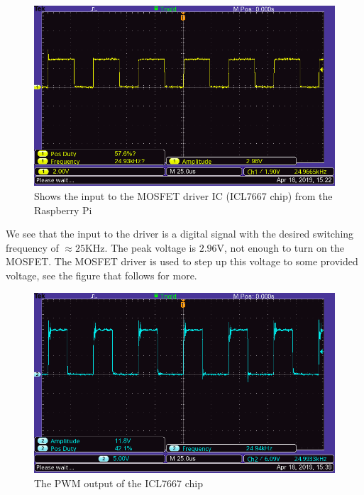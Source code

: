 \documentclass[a4paper, 12pt]{article}
\begin{document}
\begin{figure}[H]
  \centering
  \includegraphics[width=\textwidth]{images/pwm_input_from_pi.png}
  \caption{Shows the input to the MOSFET driver IC (ICL7667 chip) from the Raspberry Pi}
  \label{fig:pwm_input_from_pi}
\end{figure}

We see that the input to the driver is a digital signal with the desired switching frequency of $\approx 25$KHz. The peak voltage is $2.96$V, not enough to turn on the MOSFET. The MOSFET driver is used to step up this voltage to some provided voltage, see the figure that follows for more.

\begin{figure}[H]
  \centering
  \includegraphics[width=\textwidth]{images/pwm_output_from_chip.png}
  \caption{The PWM output of the ICL7667 chip}
  \label{fig:pwm_output_from_chip}
\end{figure}
\end{document}
